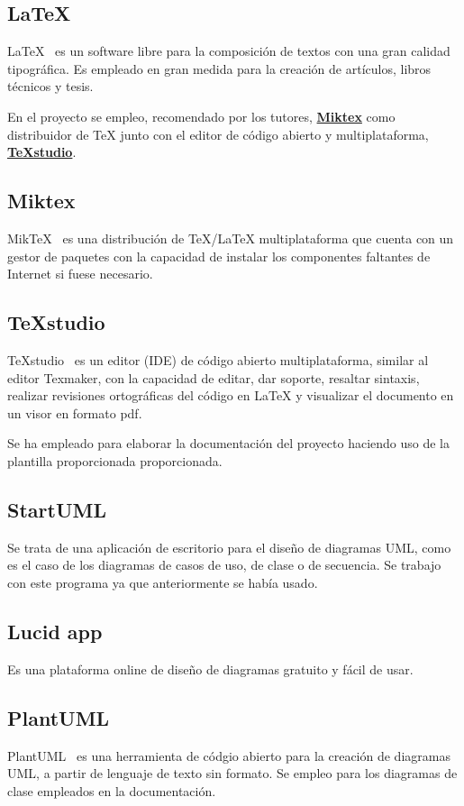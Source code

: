 \subsection{LaTeX}
LaTeX~\cite{pagina_latex} es un software libre para la composición de textos con una gran calidad tipográfica. Es empleado en gran medida para la creación de artículos, libros técnicos y tesis. 

En el proyecto se empleo, recomendado por los tutores, \textbf{\href{https://miktex.org/}{Miktex}} como distribuidor de TeX junto con el editor de código abierto y multiplataforma, \textbf{\href{https://www.texstudio.org/}{TeXstudio}}. 

\subsection{Miktex} 
MikTeX~\cite{pagina_miktex} es una distribución de TeX/LaTeX multiplataforma que cuenta con un gestor de paquetes con la capacidad de instalar los componentes faltantes de Internet si fuese necesario.

\subsection{TeXstudio}
TeXstudio~\cite{pagina_texstudio} es un editor (IDE) de código abierto multiplataforma, similar al editor Texmaker, con la capacidad de editar, dar soporte, resaltar sintaxis, realizar revisiones ortográficas del código en LaTeX y visualizar el documento en un visor en formato pdf.

Se ha empleado para elaborar la documentación del proyecto haciendo uso de la plantilla proporcionada proporcionada.

\subsection{StartUML}
Se trata de una aplicación de escritorio para el diseño de diagramas UML, como es el caso de los diagramas de casos de uso, de clase o de secuencia. Se trabajo con este programa ya que anteriormente se había usado.

\subsection{Lucid app}
Es una plataforma online de diseño de diagramas gratuito y fácil de usar.

\subsection{PlantUML}
PlantUML~\cite{pagina_PlantUML} es una herramienta de códgio abierto para la creación de diagramas UML, a partir de lenguaje de texto sin formato. Se empleo para los diagramas de clase empleados en la documentación.

